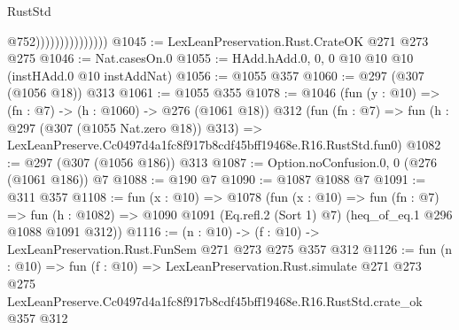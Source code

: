 \begin{lexlean}{RustStd}
\begin{coremodule}
                                  @752)))))))))))))))
@1045 := LexLeanPreservation.Rust.CrateOK @271 @273 @275
@1046 := Nat.casesOn.{0}
@1055 := HAdd.hAdd.{0, 0, 0} @10 @10 @10 (instHAdd.{0} @10 instAddNat)
@1056 := @1055 @357
@1060 := @297 (@307 (@1056 @18)) @313
@1061 := @1055 @355
@1078 := @1046
    (fun (y : @10) => (fn : @7) -> (h : @1060) -> @276 (@1061 @18))
    @312
    (fun (fn : @7) =>
    fun (h : @297 (@307 (@1055 Nat.zero @18)) @313) =>
    LexLeanPreserve.Cc0497d4a1fc8f917b8cdf45bff19468e.R16.RustStd.fun0)
@1082 := @297 (@307 (@1056 @186)) @313
@1087 := Option.noConfusion.{0, 0} (@276 (@1061 @186)) @7
@1088 := @190 @7
@1090 := @1087 @1088 @7
@1091 := @311 @357
@1108 := fun (x : @10) =>
  @1078
    (fun (x : @10) =>
    fun (fn : @7) =>
    fun (h : @1082) => @1090 @1091 (Eq.refl.{2} (Sort 1) @7) (heq_of_eq.{1} @296 @1088 @1091 @312))
@1116 := (n : @10) -> (f : @10) -> LexLeanPreservation.Rust.FunSem @271 @273 @275 @357 @312
@1126 := fun (n : @10) =>
  fun (f : @10) =>
  LexLeanPreservation.Rust.simulate
    @271
    @273
    @275
    LexLeanPreserve.Cc0497d4a1fc8f917b8cdf45bff19468e.R16.RustStd.crate_ok
    @357
    @312
\end{coremodule}
\end{lexlean}
